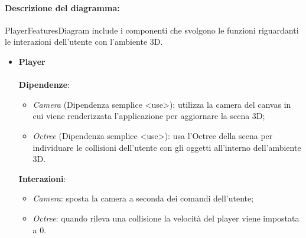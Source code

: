 		\paragraph*{Descrizione del diagramma:}
		PlayerFeaturesDiagram include i componenti che svolgono le funzioni riguardanti le interazioni dell'utente con 
		l'ambiente 3D.
\begin{itemize}
		\item \textbf{Player}
		\\\\
		\textbf{Dipendenze}:
		\begin{itemize}
			\item \textit{Camera} (Dipendenza semplice \textless use\textgreater): utilizza la camera del canvas in cui viene renderizzata l'applicazione
			 per aggiornare la scena 3D;
			\item \textit{Octree} (Dipendenza semplice \textless use\textgreater): usa l'Octree della scena per individuare le collisioni dell'utente con 
			gli oggetti all'interno dell'ambiente 3D.
		\end{itemize}
		\textbf{Interazioni}:
		\begin{itemize}
			\item \textit{Camera}: sposta la camera a seconda dei comandi dell'utente;
			\item \textit{Octree}: quando rileva una collisione la velocità del player viene impostata a 0. 
		\end{itemize}
\end{itemize}

